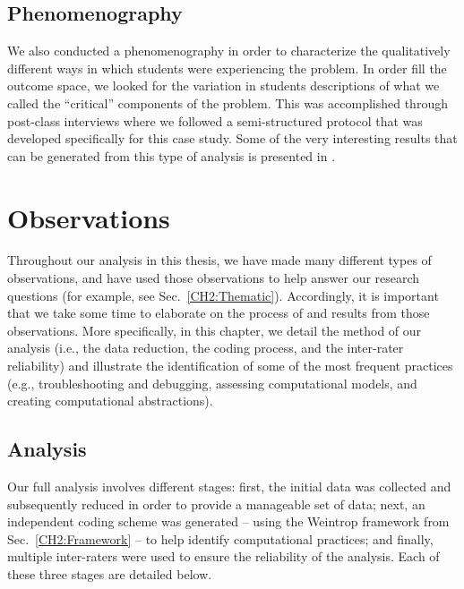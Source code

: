 \documentclass{msuphddissertation}
\begin{document}
\begin{doublespace}
\section{Phenomenography}\label{Sec:Phenom}

We also conducted a phenomenography in order to characterize the qualitatively different ways in which students were experiencing the problem.  In order fill the outcome space, we looked for the variation in students descriptions of what we called the ``critical'' components of the problem.  This was accomplished through post-class interviews where we followed a semi-structured protocol that was developed specifically for this case study.  Some of the very interesting results that can be generated from this type of analysis is presented in \cite{Hawkins2017}.

%
%
%
%
%
%
%
%
%
%
%
%
%
%
%
%

\chapter{Observations}\label{CH5:Observations}

Throughout our analysis in this thesis, we have made many different types of observations, and have used those observations to help answer our research questions (for example, see Sec.~\ref{CH2:Thematic}).  Accordingly, it is important that we take some time to elaborate on the process of and results from those observations.  More specifically, in this chapter, we detail the method of our analysis (i.e., the data reduction, the coding process, and the inter-rater reliability) and illustrate the identification of some of the most frequent practices (e.g., troubleshooting and debugging, assessing computational models, and creating computational abstractions).

\section{Analysis}\label{CH5:Analysis}

Our full analysis involves different stages: first, the initial data was collected and subsequently reduced in order to provide a manageable set of data; next, an independent coding scheme was generated -- using the Weintrop framework from Sec.~\ref{CH2:Framework} -- to help identify computational practices; and finally, multiple inter-raters were used to ensure the reliability of the analysis.  Each of these three stages are detailed below.


\end{doublespace}
\end{document}

